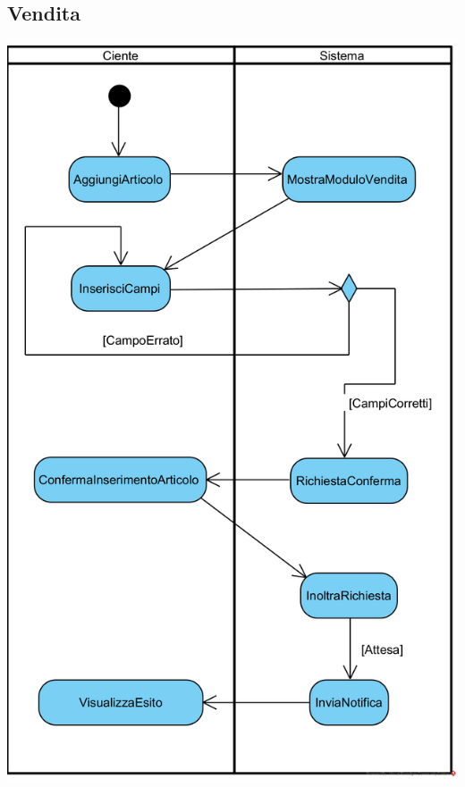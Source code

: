 \documentclass[12pt,a4paper]{article}
\begin{document}
\subsection{Vendita}
\begin{center}
\includegraphics[height=0.95\textheight]{ActivityDiagram/ClienteVendita}
\end{center}
\end{document}
